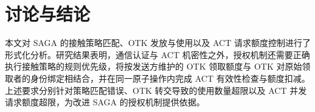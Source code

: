 
\section{讨论与结论}
\label{sec:discussion-conclusion}

本文对 SAGA 的接触策略匹配、OTK 发放与使用以及 ACT 请求额度控制进行了形式化分析。研究结果表明，通信认证与 ACT 机密性之外，授权机制还需要正确执行接触策略的规则优先级，将按发送方维护的 OTK 领取额度与 OTK 对原始领取者的身份绑定相结合，并在同一原子操作内完成 ACT 有效性检查与额度扣减。上述要求分别针对策略匹配错误、OTK 转交导致的使用数量超限以及 ACT 并发请求额度超限，为改进 SAGA 的授权机制提供依据。
